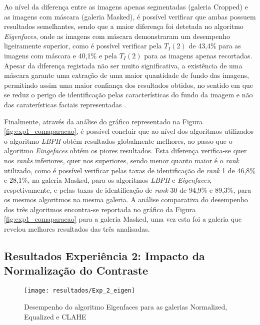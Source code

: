 Ao nível da diferença entre as imagens apenas segmentadas (galeria Cropped) e as imagens com máscara (galeria Masked), é possível verificar que ambas possuem resultados semelhantes, sendo que a maior diferença foi detetada no algoritmo \textit{Eigenfaces}, onde as imagens com máscara demonstraram um desempenho ligeiramente superior, como é possível verificar pela $T_{I}(2)$ de 43,4\% para as imagens com máscara e 40,1\% e pela $T_{I}(2)$ para as imagens apenas recortadas. Apesar da diferença registada não ser muito significativa, a existência de uma máscara garante uma extração de uma maior quantidade de fundo das imagens, permitindo assim uma maior confiança dos resultados obtidos, no sentido em que se reduz o perigo de identificação pelas características do fundo da imagem e não das caraterísticas faciais representadas \cite{Kumar2009}. 

Finalmente, através da análise do gráfico representado na Figura \ref{fig:exp1_comaparacao}, é possível concluir que ao nível dos algoritmos utilizados o algoritmo \textit{LBPH} obtém resultados globalmente melhores, ao passo que o algoritmo \textit{Eingefaces} obtém os piores resultados. Esta diferença verifica-se quer nos \textit{ranks} inferiores, quer nos superiores, sendo menor quanto maior é o \textit{rank} utilizado, como é possível verificar pelas taxas de identificação de \textit{rank} 1 de 46,8\% e 28,1\%, na galeria Masked, para os algoritmos \textit{LBPH} e \textit{Eigenfaces}, respetivamente, e pelas taxas de identificação de \textit{rank} 30 de 94,9\% e 89,3\%, para os mesmos algoritmos na mesma galeria. A análise comparativa do desempenho dos três algoritmos encontra-se reportada no gráfico da Figura \ref{fig:exp1_comaparacao} para a galeria Masked, uma vez esta foi a galeria que revelou melhores resultados das três analisadas.

\subsection{Resultados Experiência 2: Impacto da Normalização do Contraste} \label{sec:avaliacao2-exp2} \label{sub:exp2}

        \begin{figure}[ht]
                \centering
                \texttt{[image: resultados/Exp\_2\_eigen]}
                \caption{Desempenho do algoritmo Eigenfaces para as galerias Normalized, Equalized e CLAHE}
                \label{fig:masked_normalized_equalized_clahe_eigen}
        \end{figure}%

